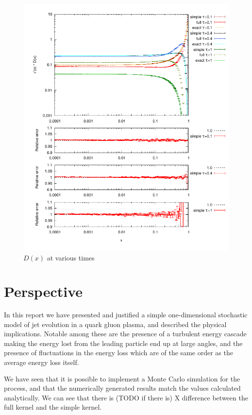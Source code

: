 \documentclass[a4paper,12pt]{article}
\numberwithin{equation}{section}
\begin{document}
\begin{figure}
\centering
\includegraphics[width=\linewidth]{times.pdf}
\caption{$D(x)$ at various times}\label{Dtimes}
\end{figure}






\section{Perspective}
In this report we have presented and justified a simple one-dimensional stochastic model of jet evolution in a quark gluon plasma, and described the physical implications. Notable among these are the presence of a turbulent energy cascade making the energy lost from the leading particle end up at large angles, and the presence of fluctuations in the energy loss which are of the same order as the average energy loss itself. 

We have seen that it is possible to implement a Monte Carlo simulation for the process, and that the numerically generated results match the values calculated analytically. We can see that there is (TODO if there is) X difference between the full kernel and the simple kernel.
\end{document}
